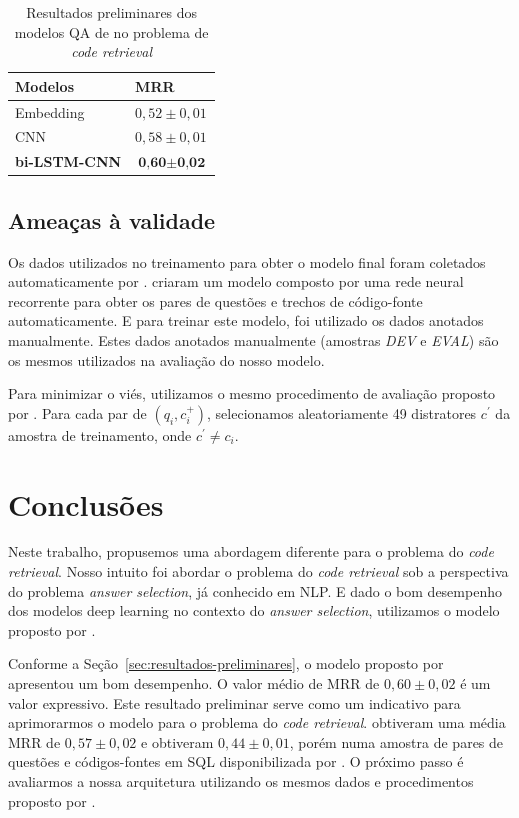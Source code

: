 \documentclass[12pt]{article}
\begin{document}
\begin{table}[h]
\centering
\begin{tabular}{ |p{3cm}|p{3cm}|  }
 \hline
 \textbf{Modelos} & \textbf{MRR}\\
 \hline
 Embedding & $0,52 \pm 0,01$\\
 \hline
 CNN & $0,58 \pm 0,01 $ \\
 \hline
 \textbf{bi-LSTM-CNN} & $\textbf{0,60} \pm \textbf{0,02}$\\
 \hline
\end{tabular}
\caption{Resultados preliminares dos modelos QA de \cite{tan-lstm-qa} no problema de \textit{code retrieval}}
\label{table:resultados-preliminares}
\end{table}

\subsection{Ameaças à validade}

Os dados utilizados no treinamento para obter o modelo final foram coletados automaticamente por \cite{Yao-staqc:2018}. \cite{Yao-staqc:2018} criaram um modelo composto por uma rede neural recorrente para obter os pares de questões e trechos de código-fonte automaticamente. E para treinar este modelo, foi utilizado os dados anotados manualmente. Estes dados anotados manualmente (amostras \emph{DEV} e \emph{EVAL}) são os mesmos utilizados na avaliação do nosso modelo. 

Para minimizar o viés, utilizamos o mesmo procedimento de avaliação proposto por \cite{iyer-etal-2016-summarizing}. Para cada par de $(q_{i}, c_{i}^{+})$, selecionamos aleatoriamente 49 distratores $c^{'}$ da amostra de treinamento, onde $c^{'} \neq c_{i}$. 

\section{Conclusões}\label{sec:conclusao}

Neste trabalho, propusemos uma abordagem diferente para o problema do \textit{code retrieval}. Nosso intuito foi abordar o problema do \textit{code retrieval} sob a perspectiva do problema \textit{answer selection}, já conhecido em NLP. E dado o bom desempenho dos modelos deep learning no contexto do \textit{answer selection}, utilizamos o modelo proposto por \cite{tan-lstm-qa}.

Conforme a Seção~\ref{sec:resultados-preliminares}, o modelo proposto por \cite{tan-lstm-qa} apresentou um bom desempenho. O valor médio de MRR de $0,60 \pm 0,02$ é um valor expressivo. Este resultado preliminar serve como um indicativo para aprimorarmos o modelo para o problema do \textit{code retrieval}. \cite{Yao-staqc:2018} obtiveram uma média MRR de $0,57 \pm 0,02$ e \cite{iyer-etal-2016-summarizing} obtiveram $0,44 \pm 0,01$, porém numa amostra de pares de questões e códigos-fontes em SQL disponibilizada por \cite{iyer-etal-2016-summarizing}. O próximo passo é avaliarmos a nossa arquitetura utilizando os mesmos dados e procedimentos proposto por \cite{Yao-staqc:2018}. 
\end{document}
